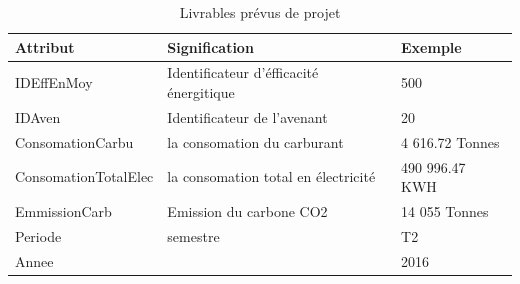 \documentclass[a4paper]{report}
\begin{document}
\begin{doublespace}
	\begin{table}[H]
		\begin{center}
			\begin{tabularx}{17.5cm}{|X|X|X|}
				\hline
				\textbf{Attribut}    & \textbf{Signification}                  &
				\textbf{Exemple}                                                          \\
				\hline
				IDEffEnMoy           & Identificateur d'éfficacité énergitique &
				500                                                                       \\
				\hline
				IDAven               & Identificateur de l'avenant             & 20       \\
				\hline
				ConsomationCarbu     & la consomation du carburant             & 4 616.72
				Tonnes                                                                    \\
				\hline
				ConsomationTotalElec & la consomation total en électricité     & 490
				996.47 KWH                                                                \\
				\hline
				EmmissionCarb        & Emission du carbone CO2                 & 14 055
				Tonnes                                                                    \\
				\hline
				Periode              & semestre                                & T2       \\
				\hline
				Annee                &                                         & 2016     \\
				\hline
			\end{tabularx}
			\caption{Livrables prévus de projet}
		\end{center}
	\end{table}


\end{doublespace}
\end{document}
